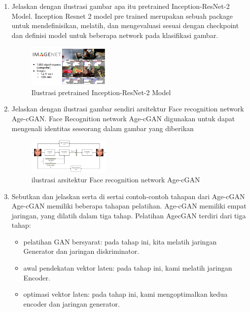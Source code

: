 \begin{enumerate}
	\item Jelaskan dengan ilustrasi gambar apa itu pretrained Inception-ResNet-2 Model.
	\hfill\break
	Inception Resnet 2 model pre trained merupakan sebuah package untuk mendefinisikan, melatih, dan mengevaluasi sesuai dengan checkpoint dan definisi model untuk beberapa network pada klasifikasi gambar.
	\begin{figure}[H]
	    \centering
	    \includegraphics[width=4cm]{figures/1174096/tugas9/teori6.PNG}
	    \caption{Ilustrasi pretrained Inception-ResNet-2 Model}
    \end{figure}

    \item  Jelaskan dengan ilustrasi gambar sendiri arsitektur Face recognition network Age-cGAN.
    \hfill\break
    Face Recognition network Age-cGAN digunakan untuk dapat mengenali identitas seseorang dalam gambar yang diberikan
    \begin{figure}[H]
	    \centering
	    \includegraphics[width=4cm]{figures/1174096/tugas9/teori7.PNG}
	    \caption{ilustrasi arsitektur Face recognition network Age-cGAN}
    \end{figure}

    \item Sebutkan dan jelaskan serta di sertai contoh-contoh tahapan dari Age-cGAN
    \hfill\break
    Age-cGAN memiliki beberapa tahapan pelatihan. Age-cGAN memiliki empat jaringan, yang dilatih dalam tiga tahap. Pelatihan AgecGAN terdiri dari tiga tahap:

	\begin{itemize} 
			\item pelatihan GAN bersyarat: pada tahap ini, kita melatih jaringan Generator dan jaringan diskriminator.
    		\item awal pendekatan vektor laten: pada tahap ini, kami melatih jaringan Encoder.
    		\item optimasi vektor laten: pada tahap ini, kami mengoptimalkan kedua encoder dan jaringan generator.
		\end{itemize}


\end{enumerate}
